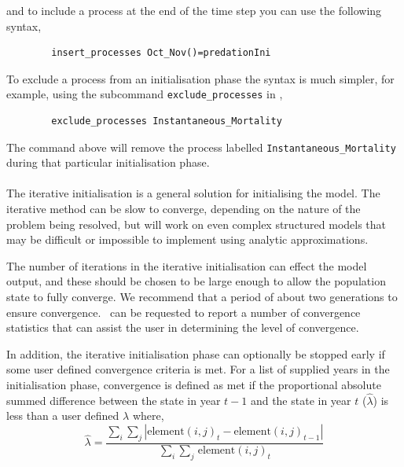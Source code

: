 and to  include a process at the end of the time step you can use the following syntax,

{\small{\begin{verbatim}
		insert_processes Oct_Nov()=predationIni
		\end{verbatim}}}
	
To exclude a process from an initialisation phase the syntax is much simpler, for example, using the subcommand \texttt{exclude\_processes} in ,

{\small{\begin{verbatim}
		exclude_processes Instantaneous_Mortality
		\end{verbatim}}}

The command above will remove the process labelled \texttt{Instantaneous\_Mortality} during that particular initialisation phase.

\paragraph{}

The iterative initialisation is a general solution for initialising the model. The iterative method can be slow to converge, depending on the nature of the problem being resolved, but will work on even complex structured models that may be difficult or impossible to implement using analytic approximations. 

The number of iterations in the iterative initialisation can effect the model output, and these should be chosen to be large enough to allow the population state to fully converge. We recommend that a period of about two generations to ensure convergence. \CNAME\ can be requested to report a number of convergence statistics that can assist the user in determining the level of convergence.

In addition, the iterative initialisation phase can optionally be stopped early if some user defined convergence criteria is met. For a list of supplied years in the initialisation phase, convergence is defined as met if the proportional absolute summed difference between the state in year $t-1$ and the state in year $t$ ($\widehat{\lambda}$) is less than a user defined $\lambda$ where, 
\begin{equation}
  \widehat{\lambda} = \frac{\sum\limits_{i} \sum\limits_{j} \left|\text{element}(i,j)_t - \text{element}(i,j)_{t-1} \right|}{\sum\limits_{i} \sum\limits_{j} \frac{}{}\text{element}(i,j)_t}
\end{equation}


